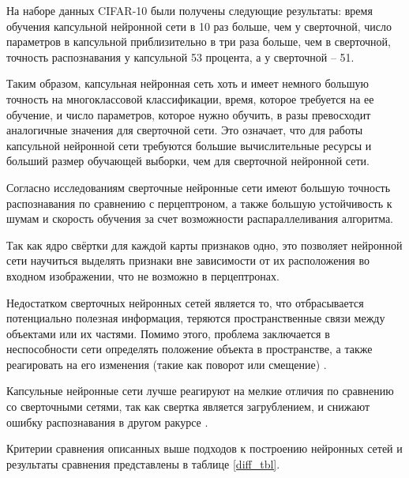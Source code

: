 На наборе данных CIFAR-10 были получены следующие результаты: время обучения капсульной нейронной сети в 10 раз больше, чем у сверточной, число параметров в капсульной приблизительно в три раза больше, чем в сверточной, точность распознавания у капсульной 53 процента, а у сверточной -- 51.

Таким образом, капсульная нейронная сеть хоть и имеет немного большую точность на многоклассовой классификации, время, которое требуется на ее обучение, и число параметров, которое нужно обучить, в разы превосходит аналогичные значения для сверточной сети. Это означает, что для работы капсульной нейронной сети требуются большие вычислительные ресурсы и больший размер обучающей выборки, чем для сверточной нейронной сети.

Согласно исследованиям \cite{research1} сверточные нейронные сети имеют большую точность распознавания по сравнению с перцептроном, а также большую устойчивость к шумам и скорость обучения за счет возможности распараллеливания алгоритма.

Так как ядро свёртки для каждой карты признаков одно, это позволяет нейронной сети научиться выделять признаки вне зависимости от их расположения во входном изображении, что не возможно в перцептронах.

Недостатком сверточных нейронных сетей является то, что отбрасывается потенциально полезная информация, теряются пространственные связи между объектами или их частями. Помимо этого, проблема заключается в неспособности сети определять положение объекта в пространстве, а также реагировать на его изменения (такие как поворот или смещение) \cite{capsule2}.

Капсульные нейронные сети лучше реагируют на мелкие отличия по сравнению со сверточными сетями, так как свертка является загрублением, и снижают ошибку распознавания в другом ракурсе \cite{galaxy}.

Критерии сравнения описанных выше подходов к построению нейронных сетей и результаты сравнения представлены в таблице \ref{diff_tbl}.

